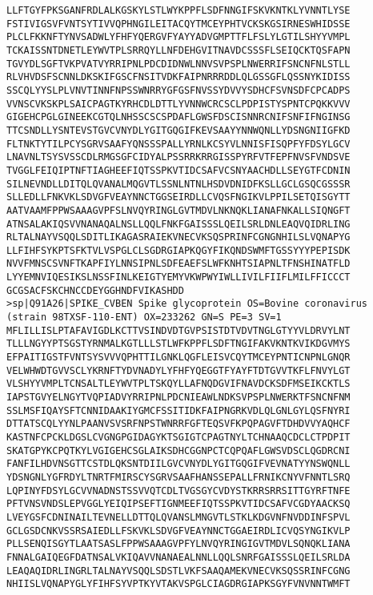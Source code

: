 \begin{lstlisting}
LLFTGYFPKSGANFRDLALKGSKYLSTLWYKPPFLSDFNNGIFSKVKNTKLYVNNTLYSE
FSTIVIGSVFVNTSYTIVVQPHNGILEITACQYTMCEYPHTVCKSKGSIRNESWHIDSSE
PLCLFKKNFTYNVSADWLYFHFYQERGVFYAYYADVGMPTTFLFSLYLGTILSHYYVMPL
TCKAISSNTDNETLEYWVTPLSRRQYLLNFDEHGVITNAVDCSSSFLSEIQCKTQSFAPN
TGVYDLSGFTVKPVATVYRRIPNLPDCDIDNWLNNVSVPSPLNWERRIFSNCNFNLSTLL
RLVHVDSFSCNNLDKSKIFGSCFNSITVDKFAIPNRRRDDLQLGSSGFLQSSNYKIDISS
SSCQLYYSLPLVNVTINNFNPSSWNRRYGFGSFNVSSYDVVYSDHCFSVNSDFCPCADPS
VVNSCVKSKPLSAICPAGTKYRHCDLDTTLYVNNWCRCSCLPDPISTYSPNTCPQKKVVV
GIGEHCPGLGINEEKCGTQLNHSSCSCSPDAFLGWSFDSCISNNRCNIFSNFIFNGINSG
TTCSNDLLYSNTEVSTGVCVNYDLYGITGQGIFKEVSAAYYNNWQNLLYDSNGNIIGFKD
FLTNKTYTILPCYSGRVSAAFYQNSSSPALLYRNLKCSYVLNNISFISQPFYFDSYLGCV
LNAVNLTSYSVSSCDLRMGSGFCIDYALPSSRRKRRGISSPYRFVTFEPFNVSFVNDSVE
TVGGLFEIQIPTNFTIAGHEEFIQTSSPKVTIDCSAFVCSNYAACHDLLSEYGTFCDNIN
SILNEVNDLLDITQLQVANALMQGVTLSSNLNTNLHSDVDNIDFKSLLGCLGSQCGSSSR
SLLEDLLFNKVKLSDVGFVEAYNNCTGGSEIRDLLCVQSFNGIKVLPPILSETQISGYTT
AATVAAMFPPWSAAAGVPFSLNVQYRINGLGVTMDVLNKNQKLIANAFNKALLSIQNGFT
ATNSALAKIQSVVNANAQALNSLLQQLFNKFGAISSSLQEILSRLDNLEAQVQIDRLING
RLTALNAYVSQQLSDITLIKAGASRAIEKVNECVKSQSPRINFCGNGNHILSLVQNAPYG
LLFIHFSYKPTSFKTVLVSPGLCLSGDRGIAPKQGYFIKQNDSWMFTGSSYYYPEPISDK
NVVFMNSCSVNFTKAPFIYLNNSIPNLSDFEAEFSLWFKNHTSIAPNLTFNSHINATFLD
LYYEMNVIQESIKSLNSSFINLKEIGTYEMYVKWPWYIWLLIVILFIIFLMILFFICCCT
GCGSACFSKCHNCCDEYGGHNDFVIKASHDD
>sp|Q91A26|SPIKE_CVBEN Spike glycoprotein OS=Bovine coronavirus (strain 98TXSF-110-ENT) OX=233262 GN=S PE=3 SV=1
MFLILLISLPTAFAVIGDLKCTTVSINDVDTGVPSISTDTVDVTNGLGTYYVLDRVYLNT
TLLLNGYYPTSGSTYRNMALKGTLLLSTLWFKPPFLSDFTNGIFAKVKNTKVIKDGVMYS
EFPAITIGSTFVNTSYSVVVQPHTTILGNKLQGFLEISVCQYTMCEYPNTICNPNLGNQR
VELWHWDTGVVSCLYKRNFTYDVNADYLYFHFYQEGGTFYAYFTDTGVVTKFLFNVYLGT
VLSHYYVMPLTCNSALTLEYWVTPLTSKQYLLAFNQDGVIFNAVDCKSDFMSEIKCKTLS
IAPSTGVYELNGYTVQPIADVYRRIPNLPDCNIEAWLNDKSVPSPLNWERKTFSNCNFNM
SSLMSFIQAYSFTCNNIDAAKIYGMCFSSITIDKFAIPNGRKVDLQLGNLGYLQSFNYRI
DTTATSCQLYYNLPAANVSVSRFNPSTWNRRFGFTEQSVFKPQPAGVFTDHDVVYAQHCF
KASTNFCPCKLDGSLCVGNGPGIDAGYKTSGIGTCPAGTNYLTCHNAAQCDCLCTPDPIT
SKATGPYKCPQTKYLVGIGEHCSGLAIKSDHCGGNPCTCQPQAFLGWSVDSCLQGDRCNI
FANFILHDVNSGTTCSTDLQKSNTDIILGVCVNYDLYGITGQGIFVEVNATYYNSWQNLL
YDSNGNLYGFRDYLTNRTFMIRSCYSGRVSAAFHANSSEPALLFRNIKCNYVFNNTLSRQ
LQPINYFDSYLGCVVNADNSTSSVVQTCDLTVGSGYCVDYSTKRRSRRSITTGYRFTNFE
PFTVNSVNDSLEPVGGLYEIQIPSEFTIGNMEEFIQTSSPKVTIDCSAFVCGDYAACKSQ
LVEYGSFCDNINAILTEVNELLDTTQLQVANSLMNGVTLSTKLKDGVNFNVDDINFSPVL
GCLGSDCNKVSSRSAIEDLLFSKVKLSDVGFVEAYNNCTGGAEIRDLICVQSYNGIKVLP
PLLSENQISGYTLAATSASLFPPWSAAAGVPFYLNVQYRINGIGVTMDVLSQNQKLIANA
FNNALGAIQEGFDATNSALVKIQAVVNANAEALNNLLQQLSNRFGAISSSLQEILSRLDA
LEAQAQIDRLINGRLTALNAYVSQQLSDSTLVKFSAAQAMEKVNECVKSQSSRINFCGNG
NHIISLVQNAPYGLYFIHFSYVPTKYVTAKVSPGLCIAGDRGIAPKSGYFVNVNNTWMFT

\end{lstlisting}
